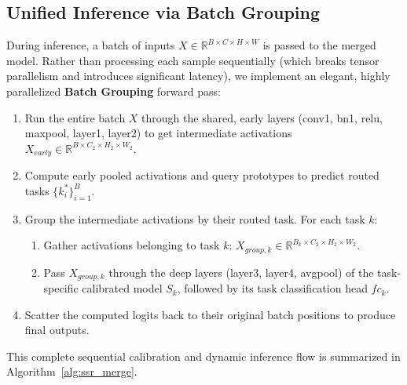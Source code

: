 \documentclass{article}
\theoremstyle{plain}
\theoremstyle{definition}
\theoremstyle{remark}
\begin{document}
\subsection{Unified Inference via Batch Grouping}
During inference, a batch of inputs $X \in \mathbb{R}^{B \times C \times H \times W}$ is passed to the merged model. Rather than processing each sample sequentially (which breaks tensor parallelism and introduces significant latency), we implement an elegant, highly parallelized \textbf{Batch Grouping} forward pass:
\begin{enumerate}
    \item Run the entire batch $X$ through the shared, early layers (conv1, bn1, relu, maxpool, layer1, layer2) to get intermediate activations $X_{early} \in \mathbb{R}^{B \times C_2 \times H_2 \times W_2}$.
    \item Compute early pooled activations and query prototypes to predict routed tasks $\{k^*_i\}_{i=1}^B$.
    \item Group the intermediate activations by their routed task. For each task $k$:
    \begin{enumerate}
        \item Gather activations belonging to task $k$: $X_{group, k} \in \mathbb{R}^{B_k \times C_2 \times H_2 \times W_2}$.
        \item Pass $X_{group, k}$ through the deep layers (layer3, layer4, avgpool) of the task-specific calibrated model $S_k$, followed by its task classification head $fc_k$.
    \end{enumerate}
    \item Scatter the computed logits back to their original batch positions to produce final outputs.
\end{enumerate}
This complete sequential calibration and dynamic inference flow is summarized in Algorithm~\ref{alg:ssr_merge}.
\end{document}
